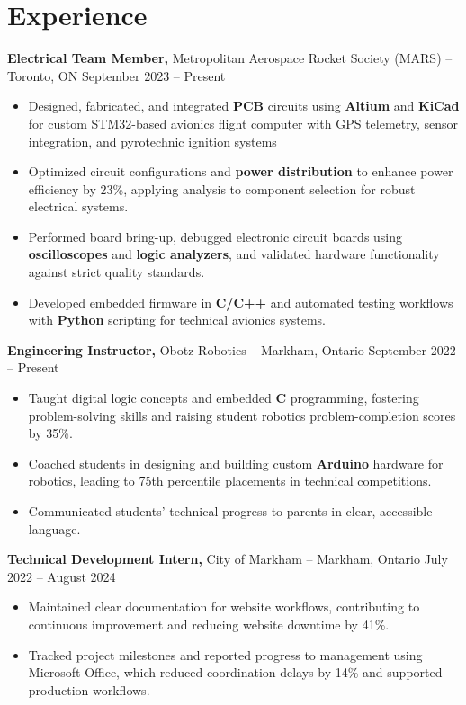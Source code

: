 \documentclass[11pt]{article}
\begin{document}
\section*{Experience}

\smallskip
\textbf{Electrical Team Member,} {Metropolitan Aerospace Rocket Society (MARS)} -- Toronto, ON \hfill September 2023 -- Present \\
\vspace{-9pt}
\begin{itemize}
  \item Designed, fabricated, and integrated \textbf{PCB} circuits using \textbf{Altium} and \textbf{KiCad} for custom STM32-based avionics flight computer with GPS telemetry, sensor integration, and pyrotechnic ignition systems
  \item Optimized circuit configurations and \textbf{power distribution} to enhance power efficiency by 23\%, applying analysis to component selection for robust electrical systems.
  \item Performed board bring-up, debugged electronic circuit boards using \textbf{oscilloscopes} and \textbf{logic analyzers}, and validated hardware functionality against strict quality standards.
  \item Developed embedded firmware in \textbf{C/C++} and automated testing workflows with \textbf{Python} scripting for technical avionics systems.
\end{itemize}

\smallskip
\textbf{Engineering Instructor,} {Obotz Robotics} -- Markham, Ontario \hfill September 2022 -- Present \\
\begin{itemize}
  \item Taught digital logic concepts and embedded \textbf{C} programming, fostering problem-solving skills and raising student robotics problem-completion scores by 35\%.
  \item Coached students in designing and building custom \textbf{Arduino} hardware for robotics, leading to 75th percentile placements in technical competitions.
  \item Communicated students' technical progress to parents in clear, accessible language.
\end{itemize}

\smallskip
\textbf{Technical Development Intern,} {City of Markham} -- Markham, Ontario \hfill July 2022 -- August 2024 \\
\begin{itemize}
  \item Maintained clear documentation for website workflows, contributing to continuous improvement and reducing website downtime by 41\%.
  \item Tracked project milestones and reported progress to management using Microsoft Office, which reduced coordination delays by 14\% and supported production workflows.
\end{itemize}
\end{document}
